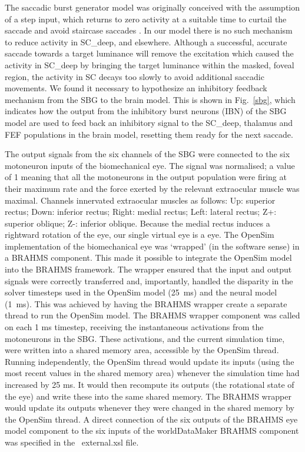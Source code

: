 The saccadic burst generator model was originally conceived with the
assumption of a step input, which returns to zero activity at a suitable
time to curtail the saccade and avoid staircase
saccades \citep{gancarz_neural_1998}. In our model
there is no such mechanism to reduce activity in SC\_deep, and elsewhere.
Although a successful, accurate saccade towards a target luminance will
remove the excitation
which caused the activity in SC\_deep by bringing the target luminance
within the masked,
foveal region, the activity in SC decays too slowly to avoid
additional saccadic movements. We found it necessary to hypothesize
an inhibitory feedback mechanism from the SBG to the brain model.
This is shown in Fig.~\ref{sbg}, which indicates how the output from
the inhibitory burst neurons (IBN) of the SBG model are used to feed
back an inhibitory signal to the SC\_deep, thalamus and FEF populations
in the brain model, resetting them ready for the next saccade.

The output signals from the six channels of the SBG were connected to
the six motoneuron inputs of the biomechanical eye. The signal was
normalised; a value of 1 meaning that all the motoneurons in the
output population were firing at their maximum rate and the force
exerted by the relevant extraocular muscle was maximal. Channels
innervated extraocular muscles as follows: Up: superior rectus; Down:
inferior rectus; Right: medial rectus; Left: lateral rectus; Z+:
superior oblique; Z-: inferior oblique. Because the medial rectus
induces a rightward rotation of the eye, our single virtual eye is
a  eye. The OpenSim implementation of the biomechanical eye
was `wrapped' (in the software sense) in a BRAHMS component. This made
it possible to integrate the OpenSim model into the BRAHMS
framework. The wrapper ensured that the input and output signals were
correctly transferred and, importantly, handled the disparity in the
solver timesteps used in the OpenSim model (25~ms) and the neural
model (1~ms). This was achieved by having the BRAHMS wrapper create a
separate thread to run the OpenSim model. The BRAHMS wrapper component
was called on each 1 ms timestep, receiving the instantaneous
activations from the motoneurons in the SBG. These activations, and
the current simulation time, were written into a shared memory area,
accessible by the OpenSim thread. Running independently, the OpenSim
thread would update its inputs (using the most recent values in the
shared memory area) whenever the simulation time had increased by 25
ms. It would then recompute its outputs (the rotational state of the
eye) and write these into the same shared memory. The BRAHMS wrapper
would update its outputs whenever they were changed in the shared
memory by the OpenSim thread. A direct connection of the six outputs
of the BRAHMS eye model component to the six inputs of the
worldDataMaker BRAHMS component was specified in
the \stob~external.xsl file.

